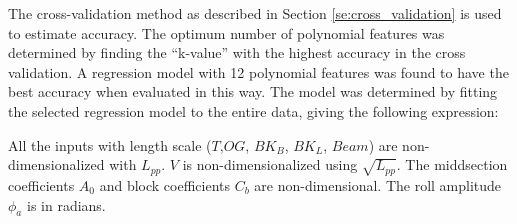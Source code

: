 The cross-validation method as described in Section \ref{se:cross_validation} is used to estimate accuracy. The optimum number of polynomial features was determined by finding the ``k-value'' with the highest accuracy in the cross validation. A regression model with 12 polynomial features was found to have the best accuracy when evaluated in this way. The model was determined by fitting the selected regression model to the entire data, giving the following expression:


All the inputs with length scale ($T$,$OG$, $BK_{B}$, $BK_{L}$, $Beam$) are non-dimensionalized with $L_{pp}$. $V$ is non-dimensionalized using $\sqrt{L_{pp}}$. The middsection coefficients $A_0$ and block coefficients $C_b$ are non-dimensional. The roll amplitude $\phi_a$ is in radians.


